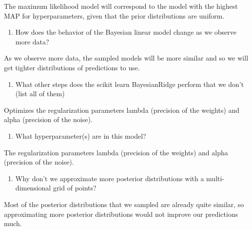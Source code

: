 \documentclass[11pt]{article}
\providecommand{\tightlist}{%
      \setlength{\itemsep}{0pt}\setlength{\parskip}{0pt}}
\begin{document}
The maximum likelihood model will correspond to the model with the
highest MAP for hyperparameters, given that the prior distributions are
uniform.

\begin{enumerate}
\def\labelenumi{\arabic{enumi}.}
\setcounter{enumi}{3}
\tightlist
\item
  How does the behavior of the Bayesian linear model change as we
  observe more data?
\end{enumerate}

As we observe more data, the sampled models will be more similar and so
we will get tighter distributions of predictions to use.

\begin{enumerate}
\def\labelenumi{\arabic{enumi}.}
\setcounter{enumi}{4}
\tightlist
\item
  What other steps does the scikit learn BayesianRidge perform that we
  don't (list all of them)
\end{enumerate}

Optimizes the regularization parameters lambda (precision of the
weights) and alpha (precision of the noise).

\begin{enumerate}
\def\labelenumi{\arabic{enumi}.}
\setcounter{enumi}{5}
\tightlist
\item
  What hyperparameter(s) are in this model?
\end{enumerate}

The regularization parameters lambda (precision of the weights) and
alpha (precision of the noise).

\begin{enumerate}
\def\labelenumi{\arabic{enumi}.}
\setcounter{enumi}{6}
\tightlist
\item
  Why don't we approximate more posterior distributions with a
  multi-dimensional grid of points?
\end{enumerate}

Most of the posterior distributions that we sampled are already quite
similar, so approximating more posterior distributions would not improve
our predictions much.


    
    
    
    
\end{document}
